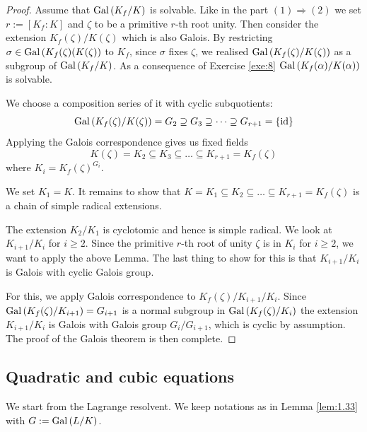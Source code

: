 \documentclass[twoside = false,	%
		headsepline,		%
		parskip = true,
		]{scrbook}						%
\begin{document}
    \begin{proof}
    
    Assume that $\mathrm{Gal}\left( K_f/K\right)$ is solvable. Like in the part $(1) \Rightarrow (2)$ we set $r:=[K_f:K]$ and $\zeta$ to be a primitive $r$-th root unity. Then consider the extension $K_f(\zeta)/K(\zeta)$ which is also Galois. By restricting $\sigma \in \mathrm{Gal}\left( K_f(\zeta)(K(\zeta)\right)$ to $K_f$, since $\sigma$ fixes $\zeta$, we realised $\mathrm{Gal}\left( K_f(\zeta)/K(\zeta)\right)$ as a subgroup of $\mathrm{Gal}\left( K_f/K\right)$. As a consequence of Exercise \ref{exe:8} $\mathrm{Gal}\left( K_f(\alpha)/K(\alpha)\right)$ is solvable.
    
    We choose a composition series of it with cyclic subquotients:
    \begin{equation*}
        \mathrm{Gal}\left( K_f(\zeta)/K(\zeta)\right) = G_2 \supseteq G_3 \supseteq \dots \supseteq G_{r+1} = \{\mathrm{id}\}
    \end{equation*}
    Applying the Galois correspondence gives us fixed fields
    \begin{equation*}
        K(\zeta) = K_2 \subseteq K_3 \subseteq \dots \subseteq K_{r+1} = K_f(\zeta)
    \end{equation*}
    where $K_i = K_f(\zeta)^{G_i}$.
    
    We set $K_1 = K$. It remains to show that $K = K_1 \subseteq K_2 \subseteq \dots \subseteq K_{r+1} = K_f(\zeta)$ is a chain of simple radical extensions.
    
    The extension $K_2 / K_1$ is cyclotomic and hence is simple radical. We look at $K_{i+1}/K_i$ for $i \geq 2$.
    Since the primitive $r$-th root of unity $\zeta$ is in $K_i$ for $i \geq 2$, we want to apply the above Lemma.
    The last thing to show for this is that $K_{i+1}/K_i$ is Galois with cyclic Galois group.
    
    For this, we apply Galois correspondence to $K_f(\zeta)/K_{i+1}/K_i$. 
    Since $\mathrm{Gal}\left( K_f(\zeta)/K_{i+1}\right) = G_{i+1}$ is a normal subgroup in $\mathrm{Gal}\left( K_f(\zeta)/K_i\right)$ the extension $K_{i+1}/K_i$ is Galois with Galois group $G_i/G_{i+1}$, which is cyclic by assumption.
    The proof of the Galois theorem is then complete.    
    \end{proof}
    
    \subsection{Quadratic and cubic equations}

    We start from the Lagrange resolvent. We keep notations as in Lemma \ref{lem:1.33} with $G:=\mathrm{Gal}\left( L/K\right)$.
    
\end{document}

